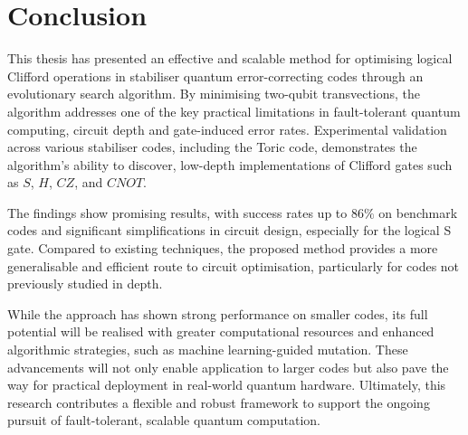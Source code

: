 \chapter{Conclusion} \label{Chap6}
This thesis has presented an effective and scalable method for optimising logical Clifford operations in stabiliser quantum error-correcting codes through an evolutionary search algorithm. By minimising two-qubit transvections, the algorithm addresses one of the key practical limitations in fault-tolerant quantum computing, circuit depth and gate-induced error rates. Experimental validation across various stabiliser codes, including the Toric code, demonstrates the algorithm's ability to discover, low-depth implementations of Clifford gates such as \(S\), \(H\), \(CZ\), and \(CNOT\).

The findings show promising results, with success rates up to \(86\%\) on benchmark codes and significant simplifications in circuit design, especially for the logical S gate. Compared to existing techniques, the proposed method provides a more generalisable and efficient route to circuit optimisation, particularly for codes not previously studied in depth.

While the approach has shown strong performance on smaller codes, its full potential will be realised with greater computational resources and enhanced algorithmic strategies, such as machine learning-guided mutation. These advancements will not only enable application to larger codes but also pave the way for practical deployment in real-world quantum hardware. Ultimately, this research contributes a flexible and robust framework to support the ongoing pursuit of fault-tolerant, scalable quantum computation.
